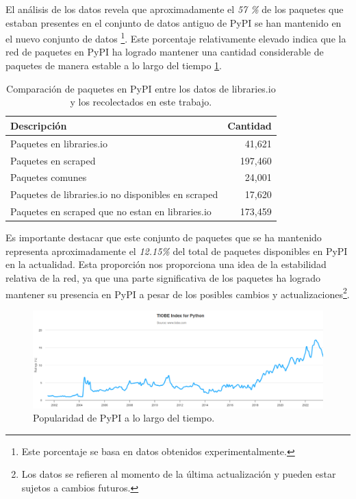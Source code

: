 El análisis de los datos revela que aproximadamente el \textit{57 \%} de los paquetes que estaban
presentes en el conjunto de datos antiguo de PyPI se han mantenido en el nuevo conjunto de datos
\footnote{Este porcentaje se basa en datos obtenidos experimentalmente.}. Este porcentaje
relativamente elevado indica que la red de paquetes en PyPI ha logrado mantener una cantidad considerable
de paquetes de manera estable a lo largo del tiempo \ref{tab:pypi_common_packages}.

\begin{table}[h!]
    \begin{center}
        \begin{tabular}{|l|r|}
            \hline
            \textbf{Descripción}                               & \textbf{Cantidad} \\
            \hline
            Paquetes en libraries.io                           & 41,621            \\
            Paquetes en scraped                                & 197,460           \\
            Paquetes comunes                                   & 24,001            \\
            Paquetes de libraries.io no disponibles en scraped & 17,620            \\
            Paquetes en scraped que no estan en libraries.io   & 173,459           \\
            \hline
        \end{tabular}
    \end{center}
    \label{tab:pypi_common_packages}
    \caption{Comparación de paquetes en PyPI entre los datos de libraries.io y los recolectados en este trabajo.}
\end{table}

Es importante destacar que este conjunto de paquetes que se ha mantenido representa aproximadamente
el \textit{12.15\%} del total de paquetes disponibles en PyPI en la actualidad. Esta proporción nos
proporciona una idea de la estabilidad relativa de la red, ya que una parte significativa de los
paquetes ha logrado mantener su presencia en PyPI a pesar de los posibles cambios y
actualizaciones\footnote{Los datos se refieren al momento de la última actualización y pueden estar
    sujetos a cambios futuros.}.

\begin{figure}[h!]
    \begin{center}
        \includegraphics[width=1\textwidth]{img/pypi/pypi_popularity.png}
        \caption{Popularidad de PyPI a lo largo del tiempo.}
        \label{fig:pypi_popularity}
    \end{center}
\end{figure}


